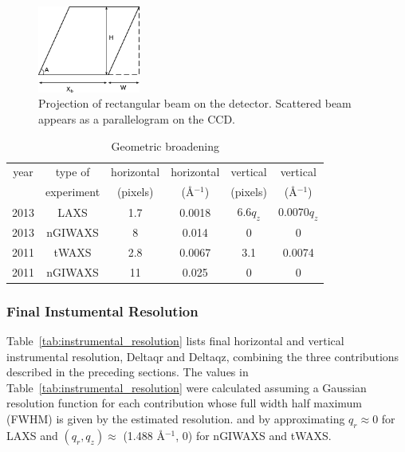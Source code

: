 \begin{figure}[htbp]
  \centering
  \includegraphics[width=0.3\textwidth]{figures/ripple/MMs/transmission/geometric_broadening4}
  \caption[Projection of rectangular beam on the detector]
  {Projection of rectangular beam on the detector. Scattered beam
  appears as a parallelogram on the CCD.}
  \label{fig:gb_trans3}
\end{figure}

\begin{table}[p]
  \centering
  \begin{tabular}{cccccc}
    \hline
    year & type of & horizontal & horizontal & vertical & vertical \\
     & experiment & (pixels) & (\AA$^{-1}$) & (pixels) & (\AA$^{-1}$) \\
    \hline
    2013 & LAXS & 1.7 & 0.0018 & 6.6$q_z$ & 0.0070$q_z$ \\
    2013 & nGIWAXS & 8 & 0.014 & 0 & 0 \\
    2011 & tWAXS & 2.8 & 0.0067 & 3.1 & 0.0074 \\
    2011 & nGIWAXS & 11 & 0.025 & 0 & 0 \\
    \hline
  \end{tabular}
  \caption[Geometric broadening]
  {Geometric broadening}
  \label{tab:geometric_broadening}
\end{table}

\newpage
\subsubsection{Final Instumental Resolution}\label{sec:resolution_formula}
Table~\ref{tab:instrumental_resolution} lists final 
horizontal and vertical instrumental resolution, \gls{Deltaqr} and \gls{Deltaqz},
combining the three contributions described in the preceding sections.
The values in Table~\ref{tab:instrumental_resolution} were calculated
assuming a Gaussian resolution function for each contribution
whose full width half maximum (\acs{FWHM}) is given by the estimated resolution.
and by approximating $q_r \approx 0$ for LAXS and 
$(q_r, q_z)\approx$ (1.488 \AA$^{-1}$, 0) for nGIWAXS and tWAXS.


